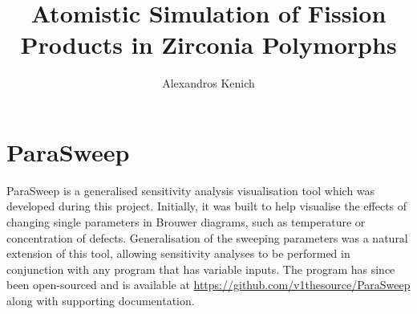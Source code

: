 \documentclass[a4paper,12pt,twoside]{report}
\begin{document}

\title{\LARGE {\bf Atomistic Simulation of Fission Products in Zirconia Polymorphs}
}

\author{Alexandros Kenich}

\normallinespacing
\maketitle



\preface
{}
%
%

\body

\doublespacing

 

\label{References}
\renewcommand\bibname{References}



\appendix
\label{Appendix}

\chapter{ParaSweep}

ParaSweep is a generalised sensitivity analysis visualisation tool which was developed during this project. Initially, it was built to help visualise the effects of changing single parameters in Brouwer diagrams, such as temperature or concentration of defects. Generalisation of the sweeping parameters was a natural extension of this tool, allowing sensitivity analyses to be performed in conjunction with any program that has variable inputs. The program has since been open-sourced and is available at \href{https://github.com/v1thesource/ParaSweep}{https://github.com/v1thesource/ParaSweep} along with supporting documentation.
\end{document}

